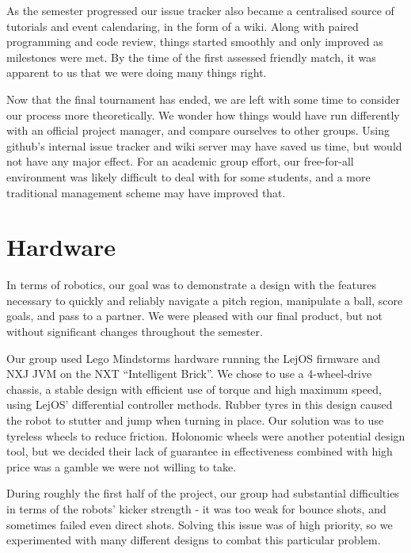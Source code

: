 \documentclass[a4paper,11pt]{article}
\begin{document}
As the semester progressed our issue tracker also became a centralised source of tutorials and event calendaring, in the form of a wiki. Along with paired programming and code review, things started smoothly and only improved as milestones were met. By the time of the first assessed friendly match, it was apparent to us that we were doing many things right.

Now that the final tournament has ended, we are left with some time to consider our process more theoretically. We wonder how things would have run differently with an official project manager, and compare ourselves to other groups. Using github's internal issue tracker and wiki  server may have saved us time, but would not have any major effect. For an academic group effort, our free-for-all environment was likely difficult to deal with for some students, and a more traditional management scheme may have improved that.




\section{Hardware}

In terms of robotics, our goal was to demonstrate a design with the features necessary to quickly and reliably navigate a pitch region, manipulate a ball, score goals, and pass to a partner. We were pleased with our final product, but not without significant changes throughout the semester.

Our group used Lego Mindstorms hardware running the LejOS firmware and NXJ JVM  on the NXT “Intelligent Brick”. We chose to use a 4-wheel-drive chassis, a stable design with efficient use of torque and high maximum speed, using LejOS’ differential controller methods. Rubber tyres in this design caused the robot to stutter and jump when turning in place. Our solution was to use tyreless wheels to reduce friction. Holonomic wheels were another potential design tool, but we decided their lack of guarantee in effectiveness combined with high price was a gamble we were not willing to take.

During roughly the first half of the project, our group had substantial difficulties in terms of the robots’ kicker strength - it was too weak for bounce shots, and sometimes failed even direct shots. Solving this issue was of high priority, so we experimented with many different designs to combat this particular problem. 
\end{document}
